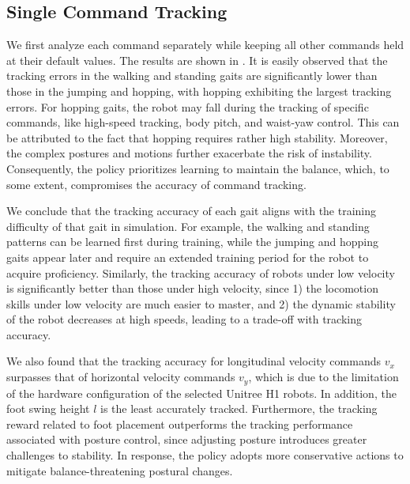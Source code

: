 

\subsection{Single Command Tracking}
We first analyze each command separately while keeping all other commands held at their default values. The results are shown in .
It is easily observed that the tracking errors in the walking and standing gaits are significantly lower than those in the jumping and hopping, with hopping exhibiting the largest tracking errors.
For hopping gaits, the robot may fall during the tracking of specific commands, like high-speed tracking, body pitch, and waist-yaw control.
This can be attributed to the fact that hopping requires rather high stability. Moreover, the complex postures and motions further exacerbate the risk of instability. Consequently, the policy prioritizes learning to maintain the balance, which, to some extent, compromises the accuracy of command tracking.

We conclude that the tracking accuracy of each gait aligns with the training difficulty of that gait in simulation. For example, the walking and standing patterns can be learned first during training, while the jumping and hopping gaits appear later and require an extended training period for the robot to acquire proficiency.
Similarly, the tracking accuracy of robots under low velocity is significantly better than those under high velocity, since 1) the locomotion skills under low velocity are much easier to master, and 2) the dynamic stability of the robot decreases at high speeds, leading to a trade-off with tracking accuracy.

We also found that the tracking accuracy for longitudinal velocity commands $v_x$ surpasses that of horizontal velocity commands $v_y$, which is due to the limitation of the hardware configuration of the selected Unitree H1 robots. In addition, the {foot swing height} $l$ is the least accurately tracked.
Furthermore, the tracking reward related to foot placement outperforms the tracking performance associated with posture control, since adjusting posture introduces greater challenges to stability. In response, the policy adopts more conservative actions to mitigate balance-threatening postural changes.




